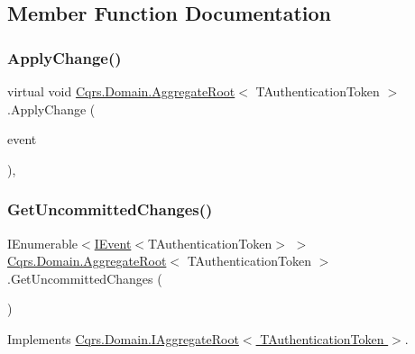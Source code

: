 \subsection{Member Function Documentation}
\mbox{\label{classCqrs_1_1Domain_1_1AggregateRoot_a7e299b13c7556731e52670aa6d782296}} 
\subsubsection{\texorpdfstring{Apply\+Change()}{ApplyChange()}}
{\footnotesize\ttfamily virtual void \hyperlink{classCqrs_1_1Domain_1_1AggregateRoot}{Cqrs.\+Domain.\+Aggregate\+Root}$<$ T\+Authentication\+Token $>$.Apply\+Change (\begin{DoxyParamCaption}\item[{\hyperlink{interfaceCqrs_1_1Events_1_1IEvent}{I\+Event}$<$ T\+Authentication\+Token $>$ @}]{event }\end{DoxyParamCaption})\hspace{0.3cm}{\ttfamily [protected]}, {\ttfamily [virtual]}}

\mbox{\label{classCqrs_1_1Domain_1_1AggregateRoot_a625e885ec7885a686f729ed1efe3a8fa}} 
\subsubsection{\texorpdfstring{Get\+Uncommitted\+Changes()}{GetUncommittedChanges()}}
{\footnotesize\ttfamily I\+Enumerable$<$\hyperlink{interfaceCqrs_1_1Events_1_1IEvent}{I\+Event}$<$T\+Authentication\+Token$>$ $>$ \hyperlink{classCqrs_1_1Domain_1_1AggregateRoot}{Cqrs.\+Domain.\+Aggregate\+Root}$<$ T\+Authentication\+Token $>$.Get\+Uncommitted\+Changes (\begin{DoxyParamCaption}{ }\end{DoxyParamCaption})}



Implements \hyperlink{interfaceCqrs_1_1Domain_1_1IAggregateRoot_a22fda414613f5ac0d4371554d7d6473b}{Cqrs.\+Domain.\+I\+Aggregate\+Root$<$ T\+Authentication\+Token $>$}.

